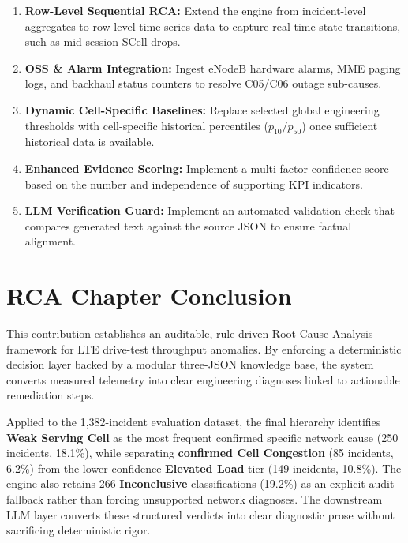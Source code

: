 \begin{enumerate}
\item \textbf{Row-Level Sequential RCA:} Extend the engine from incident-level aggregates to row-level time-series data to capture real-time state transitions, such as mid-session SCell drops.

\item \textbf{OSS \& Alarm Integration:} Ingest eNodeB hardware alarms, MME paging logs, and backhaul status counters to resolve C05/C06 outage sub-causes.

\item \textbf{Dynamic Cell-Specific Baselines:} Replace selected global engineering thresholds with cell-specific historical percentiles ($p_{10}/p_{50}$) once sufficient historical data is available.

\item \textbf{Enhanced Evidence Scoring:} Implement a multi-factor confidence score based on the number and independence of supporting KPI indicators.

\item \textbf{LLM Verification Guard:} Implement an automated validation check that compares generated text against the source JSON to ensure factual alignment.
\end{enumerate}

\section{RCA Chapter Conclusion}

This contribution establishes an auditable, rule-driven Root Cause Analysis framework for LTE drive-test throughput anomalies. By enforcing a deterministic decision layer backed by a modular three-JSON knowledge base, the system converts measured telemetry into clear engineering diagnoses linked to actionable remediation steps.

Applied to the 1,382-incident evaluation dataset, the final hierarchy identifies \textbf{Weak Serving Cell} as the most frequent confirmed specific network cause (250 incidents, 18.1\%), while separating \textbf{confirmed Cell Congestion} (85 incidents, 6.2\%) from the lower-confidence \textbf{Elevated Load} tier (149 incidents, 10.8\%). The engine also retains 266 \textbf{Inconclusive} classifications (19.2\%) as an explicit audit fallback rather than forcing unsupported network diagnoses. The downstream LLM layer converts these structured verdicts into clear diagnostic prose without sacrificing deterministic rigor.

